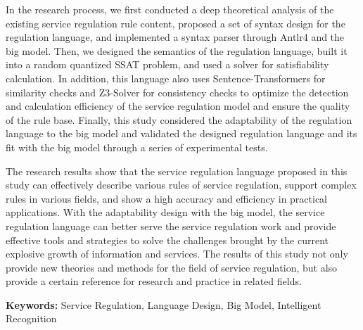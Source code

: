 In the research process, we first conducted a deep theoretical analysis of the existing service regulation rule content, proposed a set of syntax design for the regulation language, and implemented a syntax parser through Antlr4 and the big model. Then, we designed the semantics of the regulation language, built it into a random quantized SSAT problem, and used a solver for satisfiability calculation. In addition, this language also uses Sentence-Transformers for similarity checks and Z3-Solver for consistency checks to optimize the detection and calculation efficiency of the service regulation model and ensure the quality of the rule base. Finally, this study considered the adaptability of the regulation language to the big model and validated the designed regulation language and its fit with the big model through a series of experimental tests.

The research results show that the service regulation language proposed in this study can effectively describe various rules of service regulation, support complex rules in various fields, and show a high accuracy and efficiency in practical applications. With the adaptability design with the big model, the service regulation language can better serve the service regulation work and provide effective tools and strategies to solve the challenges brought by the current explosive growth of information and services. The results of this study not only provide new theories and methods for the field of service regulation, but also provide a certain reference for research and practice in related fields.

\vspace{1\baselineskip}
\noindent \textbf{Keywords:} Service Regulation, Language Design, Big Model, Intelligent Recognition